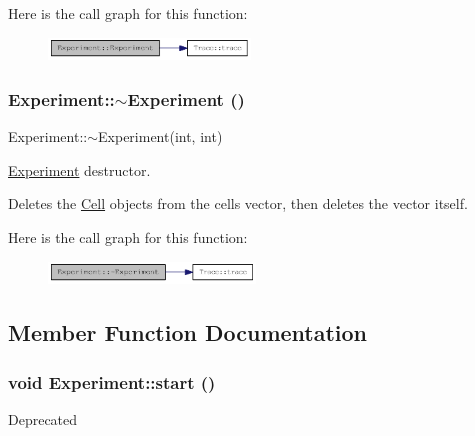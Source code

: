Here is the call graph for this function:\nopagebreak
\begin{figure}[H]
\begin{center}
\leavevmode
\includegraphics[width=152pt]{classExperiment_a512095983765afc4096aa91a157ede49_cgraph}
\end{center}
\end{figure}
\hypertarget{classExperiment_a96058d848040e45948bbb60623711da6}{
\subsubsection[{$\sim$Experiment}]{\setlength{\rightskip}{0pt plus 5cm}Experiment::$\sim$Experiment ()}}
\label{classExperiment_a96058d848040e45948bbb60623711da6}
Experiment::$\sim$Experiment(int, int)

\hyperlink{classExperiment}{Experiment} destructor.

Deletes the \hyperlink{classCell}{Cell} objects from the cells vector, then deletes the vector itself. 

Here is the call graph for this function:\nopagebreak
\begin{figure}[H]
\begin{center}
\leavevmode
\includegraphics[width=156pt]{classExperiment_a96058d848040e45948bbb60623711da6_cgraph}
\end{center}
\end{figure}


\subsection{Member Function Documentation}
\hypertarget{classExperiment_ab15fca04be9b7bcad65b264b23b4a499}{
\subsubsection[{start}]{\setlength{\rightskip}{0pt plus 5cm}void Experiment::start ()}}
\label{classExperiment_ab15fca04be9b7bcad65b264b23b4a499}
Deprecated 

